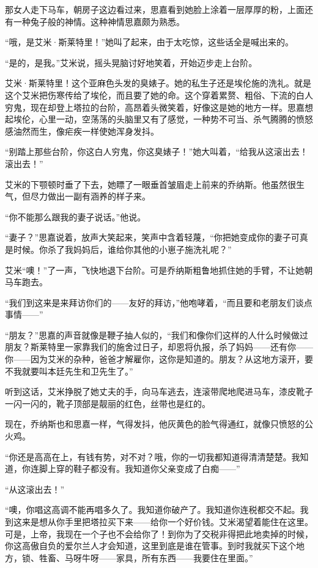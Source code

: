 \par 那女人走下马车，朝房子这边看过来，思嘉看到她脸上涂着一层厚厚的粉，上面还有一种兔子般的神情。这种神情思嘉颇为熟悉。
\par “哦，是艾米·斯莱特里！”她叫了起来，由于太吃惊，这些话全是喊出来的。
\par “是的，是我。”艾米说，摇头晃脑讨好地笑着，开始迈步走上台阶。
\par 艾米·斯莱特里！这个亚麻色头发的臭婊子。她的私生子还是埃伦施的洗礼。就是这个艾米把伤寒传给了埃伦，而且要了她的命。这个穿着累赘、粗俗、下流的白人穷鬼，现在却登上塔拉的台阶，高昂着头微笑着，好像这是她的地方一样。思嘉想起埃伦，心里一动，空荡荡的头脑里又有了感觉，一种势不可当、杀气腾腾的愤怒感油然而生，像疟疾一样使她浑身发抖。
\par “别踏上那些台阶，你这白人穷鬼，你这臭婊子！”她大叫着，“给我从这滚出去！滚出去！”
\par 艾米的下颚顿时垂了下去，她瞟了一眼垂首皱眉走上前来的乔纳斯。他虽然很生气，但尽力做出一副有涵养的样子来。
\par “你不能那么跟我的妻子说话。”他说。
\par “妻子？”思嘉说着，放声大笑起来，笑声中含着轻蔑，“你把她变成你的妻子可真是时候。你杀了我妈妈后，谁给你其他的小崽子施洗礼呢？”
\par 艾米“噢！”了一声，飞快地退下台阶。可是乔纳斯粗鲁地抓住她的手臂，不让她朝马车跑去。
\par “我们到这来是来拜访你们的——友好的拜访，”他咆哮着，“而且要和老朋友们谈点事情——”
\par “朋友？”思嘉的声音就像是鞭子抽人似的，“我们和像你们这样的人什么时候做过朋友？斯莱特里一家靠我们的施舍过日子，却恩将仇报，杀了妈妈——还有你——你——因为艾米的杂种，爸爸才解雇你，这你是知道的。朋友？从这地方滚开，要不我就要叫本廷先生和卫先生了。”
\par 听到这话，艾米挣脱了她丈夫的手，向马车逃去，连滚带爬地爬进马车，漆皮靴子一闪一闪的，靴子顶部是靓丽的红色，丝带也是红的。
\par 现在，乔纳斯也和思嘉一样，气得发抖，他灰黄色的脸气得通红，就像只愤怒的公火鸡。
\par “你还是高高在上，有钱有势，对不对？哦，你的一切我都知道得清清楚楚。我知道，你连脚上穿的鞋子都没有。我知道你父亲变成了白痴——”
\par “从这滚出去！”
\par “噢，你唱这高调不能再唱多久了。我知道你破产了。我知道你连税都交不起。我到这来是想从你手里把塔拉买下来——给你一个好价钱。艾米渴望着能住在这里。可是，上帝，我现在一个子也不会给你了！到你为了交税非得把此地卖掉的时候，你这高傲自负的爱尔兰人才会知道，这里到底是谁在管事。到时我就买下这个地方，锁、牲畜、马呀牛呀——家具，所有东西——我要住在里面。”
